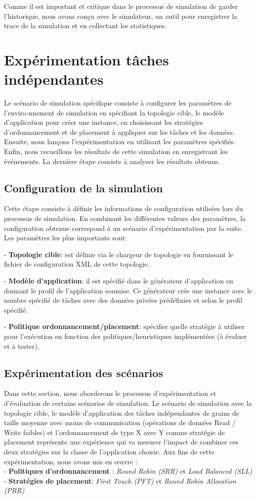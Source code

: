 Comme il est important et critique dans le processus de simulation de garder l'historique, nous avons conçu avec le simulateur, un outil pour enregistrer la trace de la simulation et en collectant les statistiques. 
\newpage
\section{Expérimentation tâches indépendantes} \label{etiar}
%
Le scénario de simulation spécifique consiste à configurer les paramètres de l'enviro-nnement de simulation en spécifiant la topologie cible, le modèle d'application pour créer une instance, en choisissant les stratégies d'ordonnancement et de placement à appliquer sur les tâches et les données. Ensuite, nous lançons l'expérimentation en utilisant les paramètres spécifiés. Enfin, nous recueillons les résultats de cette simulation en enregistrant les événements. La dernière étape consiste à analyser les résultats obtenus.
%
\subsection{Configuration de la simulation}
%
Cette étape consiste à définir les informations de configuration utilisées lors du processus de simulation. En combinant les différentes valeurs des paramètres, la configuration obtenue correspond à un scénario d'expérimentation par la suite. Les paramètres les plus importants sont:

- \textbf{Topologie cible}: est définie via le chargeur de topologie en fournissant le fichier de configuration XML de cette topologie.

- \textbf{Modèle d'application}: il est spécifié dans le générateur d'application en donnant le profil de l'application soumise. Ce générateur crée une instance avec le nombre spécifié de tâches avec des données privées prédéfinies et selon le profil spécifié.

- \textbf{Politique ordonnancement/placement}: spécifier quelle stratégie à utiliser pour l'exécution en fonction des politiques/heuristiques implémentées (à évaluer et à tester).
%
\subsection{Expérimentation des scénarios}
%
Dans cette section, nous aborderons le processus d'expérimentation et d'évaluation de certains scénarios de simulation. Le scénario de simulation avec la topologie cible, le modèle d'application des tâches indépendantes de grains de taille moyenne avec moins de communication (opérations de données Read / Write faibles) et l'ordonnancement de type X avec Y comme stratégie de placement représente une expérience qui va mesurer l'impact de combiner ces deux stratégies sur la classe de l'application choisie. Aux fins de cette expérimentation, nous avons mis en œuvre :\\
- \textbf{Politiques d'ordonnancement} : \textit{Round Robin (SRR)} et \textit{Load Balanced (SLL)}\\
- \textbf{Stratégies de placement}: \textit{First Touch (PFT)} et \textit{Round Robin Allocation (PRR)}

